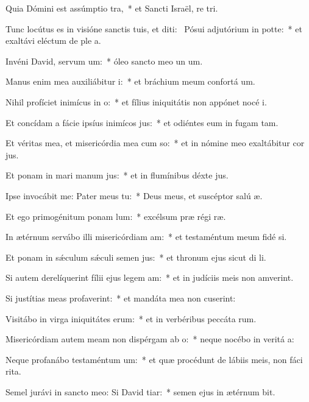 \item Quia Dómini est assúmptio tra,~* et Sancti Israël, re tri.
\item Tunc locútus es in visióne sanctis tuis, et diti:~\pscross{} Pósui adjutórium in potte:~* et exaltávi eléctum de ple a.
\item Invéni David, servum um:~* óleo sancto meo un um.
\item Manus enim mea auxiliábitur i:~* et bráchium meum confortá um.
\item Nihil profíciet inimícus in o:~* et fílius iniquitátis non appónet nocé i.
\item Et concídam a fácie ipsíus inimícos jus:~* et odiéntes eum in fugam tam.
\item Et véritas mea, et misericórdia mea cum so:~* et in nómine meo exaltábitur cor jus.
\item Et ponam in mari manum jus:~* et in flumínibus déxte jus.
\item Ipse invocábit me: Pater meus  tu:~* Deus meus, et suscéptor salú æ.
\item Et ego primogénitum ponam lum:~* excélsum præ régi ræ.
\item In ætérnum servábo illi misericórdiam am:~* et testaméntum meum fidé si.
\item Et ponam in sǽculum sǽculi semen jus:~* et thronum ejus sicut di li.
\item Si autem derelíquerint fílii ejus legem am:~* et in judíciis meis non amverint.
\item Si justítias meas profaverint:~* et mandáta mea non cuserint:
\item Visitábo in virga iniquitátes erum:~* et in verbéribus peccáta rum.
\item Misericórdiam autem meam non dispérgam ab o:~* neque nocébo in veritá a:
\item Neque profanábo testaméntum um:~* et quæ procédunt de lábiis meis, non fáci rita.
\item Semel jurávi in sancto meo: Si David tiar:~* semen ejus in ætérnum bit.
